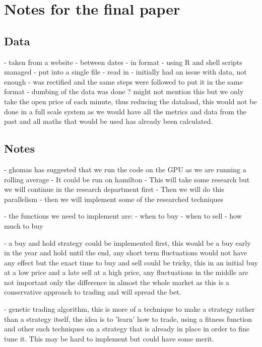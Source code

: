 \documentclass[conference]{IEEEtran}
\begin{document}

\section*{Notes for the final paper}

\subsection*{Data}
- taken from a website
- between dates
- in format
- using R and shell scripts managed
- put into a single file
- read in
- initially had an issue with data, not enough
- was rectified and the same steps were followed to put it in the same format
- dumbing of the data was done ? might not mention this but we only take the open price of each minute, thus reducing the dataload, this would not be done in a full scale system as we would have all the metrics and data from the past and all maths that would be used has already been calculated.

\subsection*{Notes}
- ghomas has suggested that we run the code on the GPU as we are running a rolling average
- It could be run on hamilton
- This will take some research but we will continue in the research department first
- Then we will do this parallelism
- then we will implement some of the researched techniques

- the functions we need to implement are:
- when to buy
- when to sell
- how much to buy

- a buy and hold strategy could be implemented first, this would be a buy early in the year and hold until the end, any short term fluctuations would not have any effect but the exact time to buy and sell could be tricky, this in an initial buy at a low price and a late sell at a high price, any fluctuations in the middle are not important only the difference in almost the whole market as this is a conservative approach to trading and will spread the bet.

- genetic trading algorithm, this is more of a technique to make a strategy rather than a strategy itself, the idea is to 'learn' how to trade, using a fitness function and other such techniques on a strategy that is already in place in order to fine tune it. This may be hard to implement but could have some merit.
\end{document}
